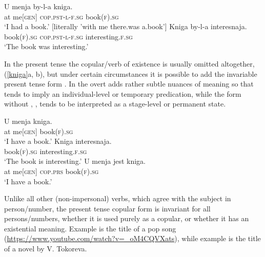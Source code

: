 \documentclass[output=paper,colorlinks,citecolor=brown]{langscibook}
\begin{document}
\ea\label{byla}
\begin{xlist}
	\ex\label{bylakniga}
	\gll	U	menja			by-l-a				kniga.\\
	at	me[\textsc{gen}]		\textsc{cop.pst-l-f.sg}	book\textsc{(f).\textsc{sg}}\\
	\glt	`I had a book.' [literally 'with me there.was a.book']
	\ex \label{bylainteresnaja}
	\gll	Kniga 					by-l-a				interesnaja.\\
	book\textsc{(f)}.\textsc{sg}	\textsc{cop.pst-l-f.sg}	interesting.\textsc{f.sg}\\
	\glt	`The book was interesting.'										
\end{xlist}
\z
In the present tense the copular/verb of existence is usually omitted altogether, (\ref{kniga}a, b), but  under certain circumstances it is possible to add the invariable present tense form . In   the overt  adds rather subtle nuances of meaning so that   tends to imply an individual-level or temporary predication, while the form without , , tends to be interpreted as a stage-level or permanent state. 

\ea
\label{kniga}
\begin{xlist} 
	\ex\label{umenjakniga}
	\gll	U	menja			kniga.\\
	at	me[\textsc{gen}]		book\textsc{(f)}.\textsc{sg}\\
	\glt	`I have a book.' 
	\ex\label{interesnaja}
	\gll	Kniga 						interesnaja.\\
	book\textsc{(f)}.\textsc{sg}			interesting.\textsc{f.sg}	\\
	\glt	`The book is interesting.'										
	\ex\label{jestkniga}
	\gll	U	menja			jest\pr{}		kniga.\\
	at	me[\textsc{gen}]		\textsc{cop.prs}	book\textsc{(f)}.\textsc{sg}\\
	\glt	`I have a book.'  							
\end{xlist}
\z

Unlike all other  (non-impersonal) verbs, which agree with the subject in person/number, the present tense copular form is invariant for all persons/numbers, whether it is used purely as a copular, or whether it has an existential meaning. Example  is the title of a  pop song (\url{https://www.youtube.com/watch?v=_oM4CQVXats}), while example   is the title of a novel by V. Tokoreva.
\end{document}
